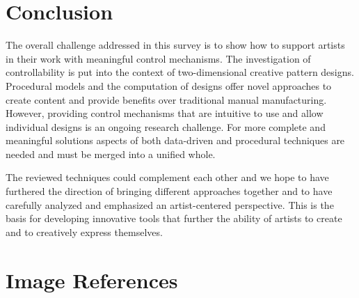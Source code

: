 

\section{Conclusion}
\label{sec:conclusion}

The overall challenge addressed in this survey is to show how to support artists in their work with meaningful control mechanisms. The investigation of controllability is put into the context of two-dimensional creative pattern designs. Procedural models and the computation of designs offer novel approaches to create content and provide benefits over traditional manual manufacturing. However, providing control mechanisms that are intuitive to use and allow individual designs is an ongoing research challenge. For more complete and meaningful solutions aspects of both data-driven and procedural techniques are needed and must be merged into a unified whole.  

The reviewed techniques could complement each other and we hope to have furthered the direction of bringing different approaches together and to have carefully analyzed and emphasized an artist-centered perspective. This is the basis for developing innovative tools that further the ability of artists to create and to creatively express themselves.


\setcounter{secnumdepth}{0} %
\section{Image References}
\label{sec:image_references}

\footnotesize
\sloppy


